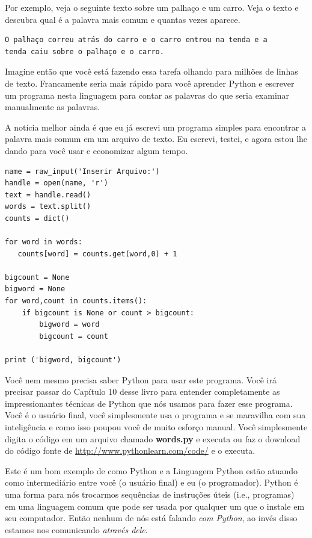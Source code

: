 Por exemplo, veja o seguinte texto sobre um palhaço e um carro. Veja o texto e descubra qual é a palavra mais comum e quantas vezes aparece.


\begin{verbatim}
O palhaço correu atrás do carro e o carro entrou na tenda e a 
tenda caiu sobre o palhaço e o carro. 
\end{verbatim}

%
Imagine então que você está fazendo essa tarefa olhando para milhões de linhas de texto. Francamente seria mais rápido para você aprender Python e escrever um programa nesta linguagem para contar as palavras do que seria examinar manualmente as palavras.

A notícia melhor ainda é que eu já escrevi um programa simples para encontrar a palavra mais comum em um arquivo de texto. Eu escrevi, testei, e agora estou lhe dando para você usar e economizar algum tempo.


\begin{verbatim}
name = raw_input('Inserir Arquivo:')
handle = open(name, 'r')
text = handle.read()
words = text.split()
counts = dict()

for word in words:
   counts[word] = counts.get(word,0) + 1

bigcount = None
bigword = None
for word,count in counts.items():
    if bigcount is None or count > bigcount:
        bigword = word
        bigcount = count

print ('bigword, bigcount')
\end{verbatim}

%
Você nem mesmo precisa saber  Python para usar este programa. Você irá precisar passar do Capítulo 10 desse livro para entender completamente as impressionantes técnicas de Python que nós usamos para fazer esse programa. Você é o usuário final, você simplesmente usa o programa e se maravilha com sua inteligência e como isso poupou você de muito esforço manual.
Você simplesmente digita o código em um arquivo chamado {\bf words.py} e  executa ou faz o download do código fonte de \url{http://www.pythonlearn.com/code/} e o executa.

Este é um bom exemplo de como Python e a Linguagem Python estão atuando como intermediário entre você (o usuário final) e eu (o programador).  Python é uma forma para nós trocarmos sequências de instruções úteis (i.e., programas) em uma linguagem comum que pode ser usada por qualquer um que o instale em seu computador. Então nenhum de nós está falando {\em com Python},
ao invés disso estamos nos comunicando {\em através dele}.


